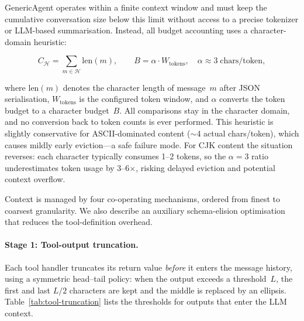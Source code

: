 GenericAgent operates within a finite context window and must keep the
cumulative conversation size below this limit without access to a precise
tokenizer or LLM-based summarisation.  Instead, all budget accounting uses
a character-domain heuristic:

\begin{equation}
  C_{\mathcal{H}} = \sum_{m \in \mathcal{H}} \mathrm{len}(m),
  \qquad
  B = \alpha \cdot W_{\text{tokens}},
  \quad \alpha \approx 3 \;\text{chars/token},
  \label{eq:char-budget}
\end{equation}

\noindent
where $\mathrm{len}(m)$ denotes the character length of message~$m$
after JSON serialisation, $W_{\text{tokens}}$ is the configured token
window, and $\alpha$ converts the token budget to a character
budget~$B$.  All comparisons stay in the character domain, and no
conversion back to token counts is ever performed.  This heuristic is
slightly conservative for ASCII-dominated content ($\sim$4 actual
chars/token), which causes mildly early eviction---a safe failure mode.
For CJK content the situation reverses: each character typically consumes
1--2 tokens, so the $\alpha{=}3$ ratio underestimates token usage by
3--6$\times$, risking delayed eviction and potential context overflow.

Context is managed by four co-operating mechanisms, ordered from finest
to coarsest granularity.  We also describe an auxiliary schema-elision
optimisation that reduces the tool-definition overhead.

\paragraph{Stage 1: Tool-output truncation.}
Each tool handler truncates its return value \emph{before} it enters the
message history, using a symmetric head--tail policy: when the output
exceeds a threshold~$L$, the first and last $L/2$ characters are kept
and the middle is replaced by an ellipsis.  Table~\ref{tab:tool-truncation}
lists the thresholds for outputs that enter the LLM context.

